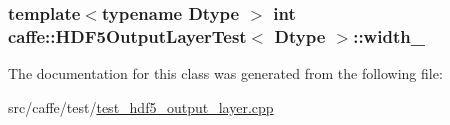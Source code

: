 \hypertarget{classcaffe_1_1_h_d_f5_output_layer_test_a867e7d0a5fc961566ed6be297f292401}{
\subsubsection[{width\+\_\+}]{\setlength{\rightskip}{0pt plus 5cm}template$<$typename Dtype $>$ int {\bf caffe\+::\+H\+D\+F5\+Output\+Layer\+Test}$<$ Dtype $>$\+::width\+\_\+\hspace{0.3cm}{\ttfamily [protected]}}}\label{classcaffe_1_1_h_d_f5_output_layer_test_a867e7d0a5fc961566ed6be297f292401}


The documentation for this class was generated from the following file\+:\begin{DoxyCompactItemize}
\item 
src/caffe/test/\hyperlink{test__hdf5__output__layer_8cpp}{test\+\_\+hdf5\+\_\+output\+\_\+layer.\+cpp}\end{DoxyCompactItemize}
